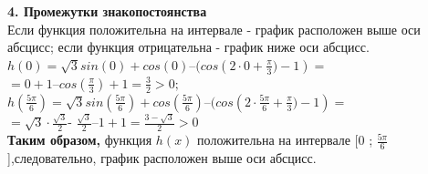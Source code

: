 \documentclass[russian,utf8,nocolumnxxxi,nocolumnxxxii]{eskdtext}
\begin{document}
{      \textbf{4. Промежутки знакопостоянства}\\
     Если функция положительна на интервале - график расположен выше оси абсцисс; если функция отрицательна - график ниже оси абсцисс. \\[10pt]
     $h{(0)} =\sqrt{3}sin(0) + cos(0)$–$(cos(2\cdot{0} + {\frac{\pi}{3})-1})=$\\
     $={0}+{1}$–$cos({\frac{\pi}{3}})+1={\frac{3}{2}}> 0;$\\
     $h{({\frac{5\pi}{6}})} =\sqrt{3}sin({\frac{5\pi}{6}}) + cos({\frac{5\pi}{6}})$–$(cos(2\cdot{{\frac{5\pi}{6}}} + {\frac{\pi}{3})-1})=$\\
     $=\sqrt{3}\cdot{\frac{\sqrt{3}}{2}}$- ${\frac{\sqrt{3}}{2}}$–$1+1={\frac{3-{\sqrt{3}}}{2}}> 0$\\[10pt]
     \textbf{Таким образом,} функция ${h(x)}$ положительна на интервале [0 ; $\frac{5{\pi}}{6}$],следовательно, график расположен выше оси абсцисс.\\
     
}
\end{document}
